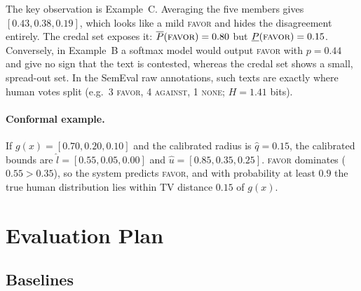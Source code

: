 \documentclass[11pt,a4paper]{article}
\newcommand{\lo}[1]{\underline{#1}}
\newcommand{\up}[1]{\overline{#1}}
\begin{document}
The key observation is Example~C. Averaging the five members gives $[0.43, 0.38, 0.19]$,
which looks like a mild \textsc{favor} and hides the disagreement entirely. The credal set
exposes it: $\up{P}(\textsc{favor}) = 0.80$ but $\lo{P}(\textsc{favor}) = 0.15$. Conversely,
in Example~B a softmax model would output \textsc{favor} with $p = 0.44$ and give no sign that
the text is contested, whereas the credal set shows a small, spread-out set. In the SemEval
raw annotations, such texts are exactly where human votes split (e.g.\ 3 \textsc{favor}, 4
\textsc{against}, 1 \textsc{none}; $H = 1.41$ bits).

\paragraph{Conformal example.} If $g(x) = [0.70, 0.20, 0.10]$ and the calibrated radius is
$\hat q = 0.15$, the calibrated bounds are $\hat l = [0.55, 0.05, 0.00]$ and
$\hat u = [0.85, 0.35, 0.25]$. \textsc{favor} dominates ($0.55 > 0.35$), so the system
predicts \textsc{favor}, and with probability at least $0.9$ the true human distribution lies
within TV distance $0.15$ of $g(x)$.

\section{Evaluation Plan}

\subsection{Baselines}
\end{document}
